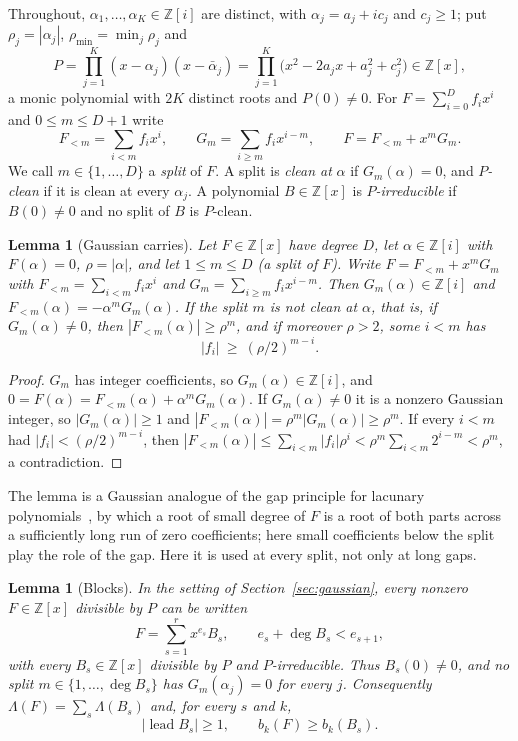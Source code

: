 \documentclass[11pt]{article}
\newtheorem{lemma}[theorem]{Lemma}
\begin{document}
Throughout, $\alpha_1,\ldots,\alpha_K\in\mathbb Z[i]$ are distinct, with
$\alpha_j=a_j+ic_j$ and $c_j\ge1$; put $\rho_j=|\alpha_j|$,
$\rho_{\min}=\min_j\rho_j$ and
\[
  P=\prod_{j=1}^K(x-\alpha_j)(x-\bar\alpha_j)
   =\prod_{j=1}^K\bigl(x^2-2a_jx+a_j^2+c_j^2\bigr)\in\mathbb Z[x],
\]
a monic polynomial with $2K$ distinct roots and $P(0)\ne0$.  For
$F=\sum_{i=0}^Df_ix^i$ and $0\le m\le D+1$ write
\[
  F_{<m}=\sum_{i<m}f_ix^i,\qquad G_m=\sum_{i\ge m}f_ix^{i-m},\qquad
  F=F_{<m}+x^mG_m .
\]
We call $m\in\{1,\ldots,D\}$ a \emph{split} of $F$.  A split is \emph{clean
at} $\alpha$ if $G_m(\alpha)=0$, and \emph{$P$-clean} if it is clean at every
$\alpha_j$.  A polynomial $B\in\mathbb Z[x]$ is \emph{$P$-irreducible} if
$B(0)\ne0$ and no split of $B$ is $P$-clean.

\begin{lemma}[Gaussian carries]\label{lem:gausscarry}
Let $F\in\mathbb Z[x]$ have degree $D$, let $\alpha\in\mathbb Z[i]$ with
$F(\alpha)=0$, $\rho=|\alpha|$, and let $1\le m\le D$ (a split of $F$).  Write
$F=F_{<m}+x^mG_m$ with $F_{<m}=\sum_{i<m}f_ix^i$ and
$G_m=\sum_{i\ge m}f_ix^{i-m}$.  Then
$G_m(\alpha)\in\mathbb Z[i]$ and $F_{<m}(\alpha)=-\alpha^mG_m(\alpha)$.  If the
split $m$ is not clean at $\alpha$, that is, if $G_m(\alpha)\ne0$, then $|F_{<m}(\alpha)|\ge\rho^m$, and if
moreover $\rho>2$, some $i<m$ has
\[
  |f_i|\ \ge\ (\rho/2)^{m-i}.
\]
\end{lemma}

\begin{proof}
$G_m$ has integer coefficients, so $G_m(\alpha)\in\mathbb Z[i]$, and
$0=F(\alpha)=F_{<m}(\alpha)+\alpha^mG_m(\alpha)$.  If $G_m(\alpha)\ne0$ it is a
nonzero Gaussian integer, so $|G_m(\alpha)|\ge1$ and
$|F_{<m}(\alpha)|=\rho^m|G_m(\alpha)|\ge\rho^m$.  If every $i<m$ had
$|f_i|<(\rho/2)^{m-i}$, then
$|F_{<m}(\alpha)|\le\sum_{i<m}|f_i|\rho^i<\rho^m\sum_{i<m}2^{i-m}<\rho^m$, a
contradiction.
\end{proof}

The lemma is a Gaussian analogue of the gap principle for lacunary
polynomials~\cite{lenstra-lacunary}, by which a root of small degree of $F$
is a root of both parts across a sufficiently long run of zero coefficients;
here small coefficients below the split play the role of the gap.  Here it is used at every split,
not only at long gaps.

\begin{lemma}[Blocks]\label{lem:gaussblocks}
In the setting of Section~\ref{sec:gaussian}, every nonzero
$F\in\mathbb Z[x]$ divisible by $P$ can be written
\[
  F=\sum_{s=1}^rx^{e_s}B_s,\qquad e_s+\deg B_s<e_{s+1},
\]
with every $B_s\in\mathbb Z[x]$ divisible by $P$ and $P$-irreducible.  Thus
$B_s(0)\ne0$, and no split $m\in\{1,\ldots,\deg B_s\}$ has
$G_m(\alpha_j)=0$ for every $j$.
Consequently $\Lambda(F)=\sum_s\Lambda(B_s)$ and, for every $s$ and $k$,
\[
  |\operatorname{lead}B_s|\ge1,\qquad b_k(F)\ge b_k(B_s).
\]
\end{lemma}
\end{document}
